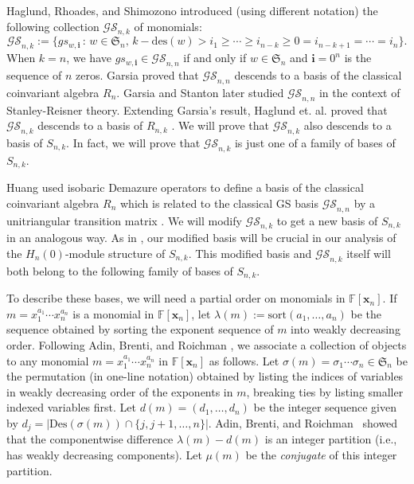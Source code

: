 \documentclass[10pt]{amsart}
\theoremstyle{definition}
\newcommand{\Des}{{\mathrm {Des}}}
\newcommand{\des}{{\mathrm {des}}}
\newcommand{\symm}{{\mathfrak{S}}}
\newcommand{\FF}{{\mathbb{F}}}
\newcommand{\GS}{{\mathcal{GS}}}
\newcommand{\xx}{{\mathbf {x}}}
\newcommand{\ii}{{\mathbf{i}}}
\begin{document}
Haglund, Rhoades, and Shimozono introduced \cite[Defn. 5.2]{HRS} (using different notation) the following 
collection $\GS_{n,k}$ of monomials:
\begin{equation*}
\GS_{n,k} := \{ gs_{w,\ii} \,:\, w \in \symm_n, \, k - \des(w) > i_1 \geq \cdots \geq i_{n-k} \geq 0 = i_{n-k+1} = \cdots = i_n\}.
\end{equation*}
When $k = n$, we have $gs_{w,\ii}\in\GS_{n,n}$ if and only if $w\in\symm_n$ and $\ii=0^n$ is the sequence of $n$ zeros.
Garsia \cite{Garsia} proved that $\GS_{n,n}$ descends to a basis of the classical coinvariant algebra $R_n$.
Garsia and Stanton \cite{GS} later studied $\GS_{n,n}$ in the context of Stanley-Reisner theory. 
Extending Garsia's result,
Haglund et. al. proved that $\GS_{n,k}$ descends to a basis of $R_{n,k}$ \cite[Thm. 5.3]{HRS}.
We will prove that $\GS_{n,k}$ also descends to a basis of $S_{n,k}$.  In fact, we will 
prove that $\GS_{n,k}$ is just one of a family of bases of $S_{n,k}$.

Huang used isobaric Demazure operators to define a basis of the classical coinvariant algebra $R_n$
which is related to the classical GS basis $\GS_{n,n}$ by a unitriangular transition matrix \cite{Huang}.
We will modify $\GS_{n,k}$ to get a new basis of $S_{n,k}$ in an analogous way.
As in \cite{Huang}, our modified basis will be crucial in our analysis of the $H_n(0)$-module structure of $S_{n,k}$.
This modified basis and $\GS_{n,k}$ itself will both belong to the following family of bases of $S_{n,k}$.

To describe these bases, we will need a partial order on monomials in $\FF[\xx_n]$.
If $m = x_1^{a_1} \cdots x_n^{a_n}$ is a monomial in $\FF[\xx_n]$, let $\lambda(m) := \mathrm{sort}(a_1, \dots, a_n)$
be the sequence obtained by sorting the exponent sequence of $m$ into weakly decreasing order.
Following Adin, Brenti, and Roichman \cite{ABR}, we associate a collection of objects to any monomial
$m = x_1^{a_1} \cdots x_n^{a_n}$ in $\FF[\xx_n]$ as follows.
Let $\sigma(m)=\sigma_1\cdots \sigma_n\in\symm_n$
 be the permutation (in one-line notation) obtained by listing the indices of variables in 
weakly decreasing order of the exponents in $m$, breaking ties by listing smaller indexed variables first.
Let $d(m) = (d_1, \dots, d_n)$ be the integer sequence given by 
$d_j = |\Des(\sigma(m)) \cap \{j, j+1, \dots, n\} |$.  
Adin, Brenti, and Roichman~\cite{ABR} showed that the componentwise difference
$\lambda(m) - d(m)$ is an integer partition (i.e., has weakly decreasing components).
Let $\mu(m)$ be the \emph{conjugate} of this integer partition.
\end{document}
